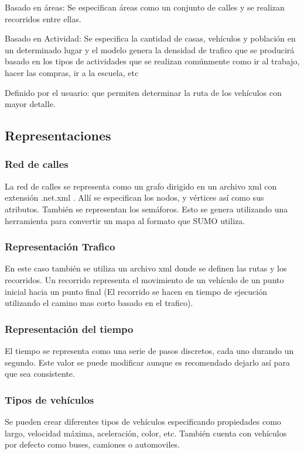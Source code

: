 Basado en áreas:  Se especifican áreas como un conjunto de calles y se realizan recorridos entre ellas.


Basado en Actividad: Se especifica la cantidad de casas, vehículos y población en un determinado lugar y el modelo genera la densidad de trafico que se producirá basado en los tipos de actividades que se realizan comúnmente como ir al trabajo, hacer las compras, ir a la escuela,  etc

Definido por el usuario: que permiten determinar la ruta de los vehículos con mayor detalle.

\subsection{Representaciones}

\subsubsection{Red de calles}
La red de calles se representa como un grafo dirigido en un archivo xml con extensión .net.xml . Allí se especifican los nodos, y vértices así como sus atributos. También se representan los semáforos. Esto  se genera utilizando una herramienta  para convertir un mapa al formato que SUMO utiliza.

\subsubsection{Representación Trafico}
En este caso también se utiliza un archivo xml donde se definen las rutas y los recorridos. Un recorrido representa el movimiento de un vehículo de un punto inicial hacia un punto final (El recorrido se hacen en tiempo de ejecución utilizando el camino mas corto basado en el trafico). 


\subsubsection{Representación del tiempo}
El tiempo se representa como una serie de pasos discretos, cada uno durando un segundo. Este valor se puede modificar aunque es recomendado dejarlo así para que sea consistente.


\subsubsection{Tipos de vehículos}
Se pueden crear diferentes tipos de vehículos especificando propiedades como largo, velocidad máxima,  aceleración, color, etc. También cuenta con vehículos por defecto como buses, camiones o automoviles.







